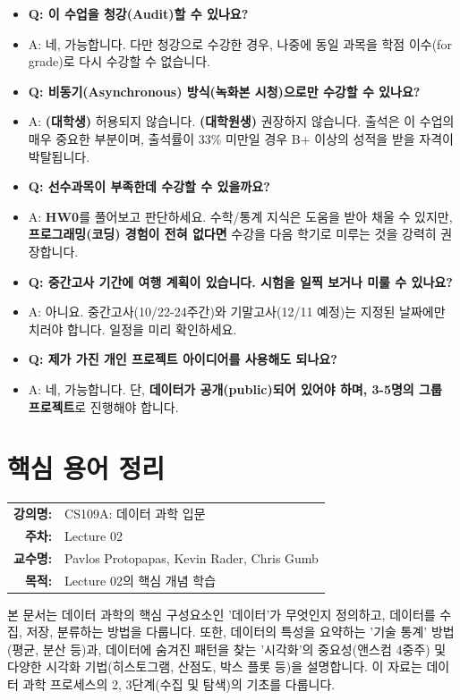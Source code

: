 \documentclass[11pt,a4paper]{book}
\makeatletter
\theoremstyle{definition}
\newcommand{\metainfo}[4]{
\begin{tcolorbox}[
    colback=lightpurple,
    colframe=darkpurple,
    boxrule=1pt,
    arc=2mm,
    left=10pt,
    right=10pt,
    top=8pt,
    bottom=8pt
]
\begin{tabular}{@{}rl@{}}
\textbf{강의명:} & #1 \\[0.3em]
\textbf{주차:} & #2 \\[0.3em]
\textbf{교수명:} & #3 \\[0.3em]
\textbf{목적:} & \begin{minipage}[t]{0.75\textwidth}#4\end{minipage}
\end{tabular}
\end{tcolorbox}
}
\makeatother
\begin{document}
\begin{itemize}
    \item \textbf{Q: 이 수업을 청강(Audit)할 수 있나요?}
    \item A: 네, 가능합니다. 다만 청강으로 수강한 경우, 나중에 동일 과목을 학점 이수(for grade)로 다시 수강할 수 없습니다.

    \item \textbf{Q: 비동기(Asynchronous) 방식(녹화본 시청)으로만 수강할 수 있나요?}
    \item A: \textbf{(대학생)} 허용되지 않습니다. \textbf{(대학원생)} 권장하지 않습니다. 출석은 이 수업의 매우 중요한 부분이며, 출석률이 33\% 미만일 경우 B+ 이상의 성적을 받을 자격이 박탈됩니다.

    \item \textbf{Q: 선수과목이 부족한데 수강할 수 있을까요?}
    \item A: \textbf{HW0}를 풀어보고 판단하세요. 수학/통계 지식은 도움을 받아 채울 수 있지만, \textbf{프로그래밍(코딩) 경험이 전혀 없다면} 수강을 다음 학기로 미루는 것을 강력히 권장합니다.

    \item \textbf{Q: 중간고사 기간에 여행 계획이 있습니다. 시험을 일찍 보거나 미룰 수 있나요?}
    \item A: 아니요. 중간고사(10/22-24주간)와 기말고사(12/11 예정)는 지정된 날짜에만 치러야 합니다. 일정을 미리 확인하세요.

    \item \textbf{Q: 제가 가진 개인 프로젝트 아이디어를 사용해도 되나요?}
    \item A: 네, 가능합니다. 단, \textbf{데이터가 공개(public)되어 있어야 하며, 3-5명의 그룹 프로젝트}로 진행해야 합니다.
\end{itemize}


\chapter{핵심 용어 정리}
\label{ch:lecture2}

\metainfo{CS109A: 데이터 과학 입문}{Lecture 02}{Pavlos Protopapas, Kevin Rader, Chris Gumb}{Lecture 02의 핵심 개념 학습}


\begin{summarybox}
본 문서는 데이터 과학의 핵심 구성요소인 '데이터'가 무엇인지 정의하고,
데이터를 수집, 저장, 분류하는 방법을 다룹니다.
또한, 데이터의 특성을 요약하는 '기술 통계' 방법(평균, 분산 등)과,
데이터에 숨겨진 패턴을 찾는 '시각화'의 중요성(앤스컴 4중주) 및
다양한 시각화 기법(히스토그램, 산점도, 박스 플롯 등)을 설명합니다.
이 자료는 데이터 과학 프로세스의 2, 3단계(수집 및 탐색)의 기초를 다룹니다.
\end{summarybox}
\end{document}
